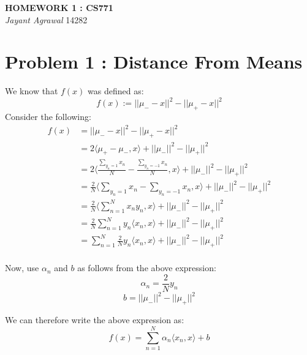 \documentclass{article}
\begin{document}

\begin{center}
\textbf{\Large HOMEWORK 1 : CS771} \\
\textit{\large Jayant Agrawal}         14282
\end{center}

\section{Problem 1 : Distance From Means}
We know that $f(x)$ was defined as:
$$f(x) := ||\mu_- - x||^2  - ||\mu_+ - x||^2 $$
Consider the following:
\begin{equation*}
\begin{aligned}
f(x) &= ||\mu_- - x||^2  - ||\mu_+ - x||^2 \\
& = 2\langle\mu_+ - \mu_- , x \rangle + ||\mu_-||^2 - ||\mu_+||^2 \\
& = 2\langle \frac{\sum_{y_n = 1}x_n}{N} - \frac{\sum_{y_n = -1}x_n}{N} , x \rangle + ||\mu_-||^2 - ||\mu_+||^2 \\
& = \frac{2}{N} \langle \sum_{y_n = 1}x_n - \sum_{y_n = -1}x_n , x \rangle + ||\mu_-||^2 - ||\mu_+||^2 \\
& = \frac{2}{N} \langle \sum_{n = 1}^Nx_ny_n, x \rangle + ||\mu_-||^2 - ||\mu_+||^2 \\
& = \frac{2}{N} \sum_{n = 1}^Ny_n \langle x_n, x \rangle + ||\mu_-||^2 - ||\mu_+||^2 \\
& = \sum_{n = 1}^N\frac{2}{N} y_n \langle x_n, x \rangle + ||\mu_-||^2 - ||\mu_+||^2 \\
\end{aligned}
\end{equation*}

Now, use $\alpha_n$ and $b$ as follows from the above expression:
$$\alpha_n = \frac{2}{N}y_n$$
$$b = ||\mu_-||^2 - ||\mu_+||^2$$

We can therefore write the above expression as:
$$f(x) = \sum_{n=1}^N \alpha_n \langle x_n,x \rangle + b$$
\end{document}
